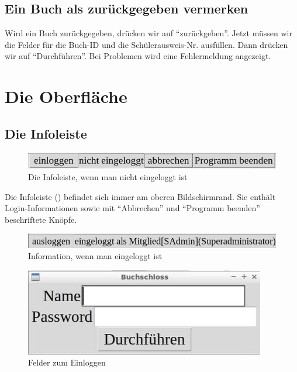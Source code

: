 
\subsection{Ein Buch als zurückgegeben vermerken}
\label{subsec:quickstart:restitute}
Wird ein Buch zurückgegeben, drücken wir auf ``zurückgeben''. Jetzt müssen wir die Felder für die Buch-ID und die Schülerausweis-Nr. ausfüllen.
Dann drücken wir auf ``Durchführen''. Bei Problemen wird eine Fehlermeldung angezeigt.


\section{Die Oberfläche}
\label{sec:interface}
\subsection{Die Infoleiste}
\label{subsec:interface:header}
\begin{figure}\includegraphics{images/gui2/head_not_logged_in.jpg}\caption{Die Infoleiste, wenn man nicht eingeloggt ist}\label{fig:head_not_logged_in}\end{figure}

Die Infoleiste () befindet sich immer am oberen Bildschirmrand.
Sie enthält Login-Informationen sowie mit ``Abbrechen'' und ``Programm beenden'' beschriftete Knöpfe.

\begin{figure}\includegraphics{images/gui2/logged_in_info.jpg}\caption{Information, wenn man eingeloggt ist}\label{fig:logged_in_info}\end{figure}
\begin{figure}\includegraphics{images/gui2/login_form.jpg}\caption{Felder zum Einloggen}\label{fig:login_form}\end{figure}

